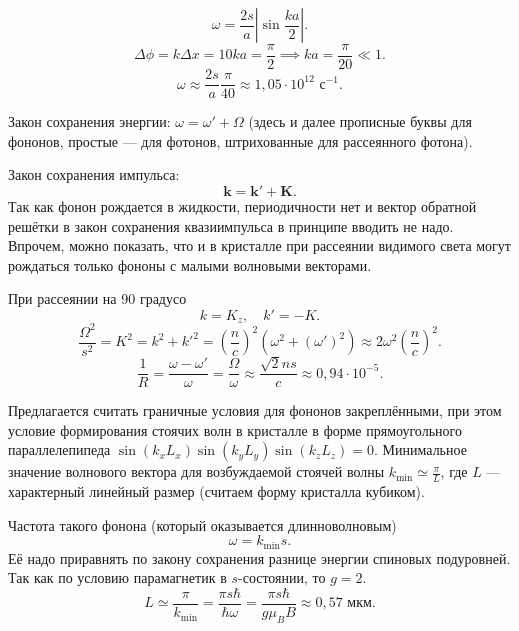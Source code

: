 \documentclass[a4paper]{article}
\begin{document}
\begin{hiProb}[2.20]
\end{hiProb}
\begin{sol}
\[
\omega = \frac{2s}{a} \left| \sin \frac{ka}{2} \right| 
.\] 
\[
\Delta \phi= k \Delta x= 10 ka= \frac{\pi}{2}\implies
 ka= \frac{\pi}{20} \ll 1
.\]
\[
	\omega \approx  \frac{2s}{a} \frac{\pi }{40} 
	\approx 1,05 \cdot 10^12 \text{ с}^{-1}
.\] 
\end{sol}
\begin{hiProb}[2.62]
\end{hiProb}
\begin{sol}
Закон сохранения энергии: $\omega=\omega'+\Omega$ 
(здесь и далее прописные буквы для фононов, простые
--- для фотонов, штрихованные для рассеянного фотона).

Закон сохранения импульса:
\[
	\mathbf{k}= \mathbf{k}'+ \mathbf{K}
.\] 
Так как фонон рождается в жидкости, периодичности нет
и вектор обратной решётки в закон сохранения квазиимпульса в принципе вводить не надо. Впрочем, можно
показать, что и в кристалле при рассеянии видимого
света могут рождаться только фононы с малыми
волновыми векторами.

При рассеянии на 90 градусо
\[
k=K_z,\quad k'=-K
.\] 
\[
	\frac{\Omega^2}{s^2}= K^2=k^2+k'^2= \left( 
	\frac{n}{c}\right) ^2 \left( 
\omega^2 +(\omega')^2\right) \approx
2\omega^2 \left( \frac{n}{c} \right) ^2
.\] 
\[
\frac{1}{R}= \frac{\omega - \omega'}{\omega}=
\frac{\Omega}{\omega} \approx \frac{\sqrt{2} n s}{c}
\approx 0,94\cdot 10^{-5}
.\] 
\end{sol}
\begin{hiProb}[2.77]
\end{hiProb}
\begin{sol}
Предлагается считать граничные условия для фононов
закреплёнными, при этом условие формирования стоячих
волн в кристалле в форме прямоугольного параллелепипеда
$\sin \left( k_x L_x \right) \sin \left( k_y L_y \right) \sin \left( k_z L_z \right) =0$. Минимальное
значение волнового вектора для возбуждаемой 
стоячей волны $k_\text{min} \simeq \frac{\pi}{L}$, где
$L$ --- характерный линейный размер (считаем
форму кристалла кубиком).

Частота такого фонона (который оказывается длинноволновым)
\[
\omega= k_{\text{min}} s
.\] 
Её надо приравнять по закону сохранения разнице энергии
спиновых подуровней. Так как по условию парамагнетик
в $s$-состоянии, то $g=2$.
\[
L \simeq \frac{\pi}{k_{\text{min}}}
=\frac{\pi s \hbar  }{\hbar \omega} = \frac{
\pi s \hbar }{g \mu_{B} B}\approx 0,57 \text{ мкм}
.\] 
\end{sol}
\end{document}
